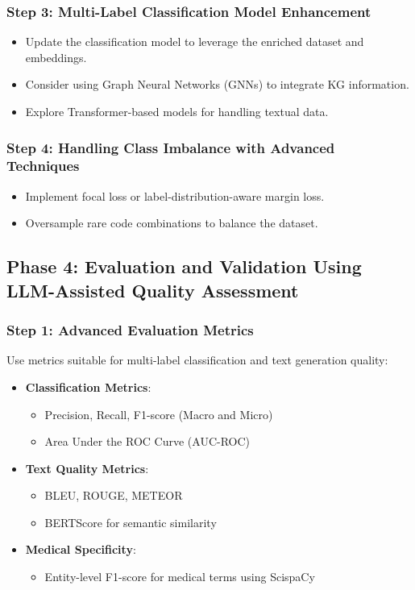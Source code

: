 \documentclass[12pt, a4paper]{article}
\begin{document}
\subsubsection{Step 3: Multi-Label Classification Model Enhancement}

\begin{itemize}
    \item Update the classification model to leverage the enriched dataset and embeddings.
    \item Consider using Graph Neural Networks (GNNs) to integrate KG information.
    \item Explore Transformer-based models for handling textual data.
\end{itemize}

\subsubsection{Step 4: Handling Class Imbalance with Advanced Techniques}

\begin{itemize}
    \item Implement focal loss or label-distribution-aware margin loss.
    \item Oversample rare code combinations to balance the dataset.
\end{itemize}

\subsection{Phase 4: Evaluation and Validation Using LLM-Assisted Quality Assessment}

\subsubsection{Step 1: Advanced Evaluation Metrics}

Use metrics suitable for multi-label classification and text generation quality:

\begin{itemize}
    \item \textbf{Classification Metrics}:
    \begin{itemize}
        \item Precision, Recall, F1-score (Macro and Micro)
        \item Area Under the ROC Curve (AUC-ROC)
    \end{itemize}
    \item \textbf{Text Quality Metrics}:
    \begin{itemize}
        \item BLEU, ROUGE, METEOR
        \item BERTScore for semantic similarity
    \end{itemize}
    \item \textbf{Medical Specificity}:
    \begin{itemize}
        \item Entity-level F1-score for medical terms using ScispaCy
    \end{itemize}
\end{itemize}
\end{document}

